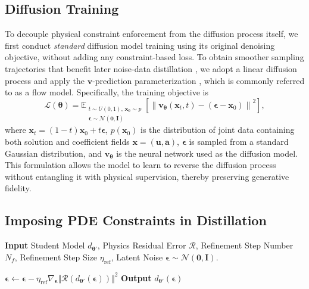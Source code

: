 \documentclass{article}
\theoremstyle{plain}
\theoremstyle{definition}
\theoremstyle{remark}
\def\va{{\bm{a}}}
\def\vu{{\bm{u}}}
\def\vv{{\bm{v}}}
\def\vx{{\bm{x}}}
\begin{document}
\subsection{Diffusion Training}
To decouple physical constraint enforcement from the diffusion process itself, we first conduct \textit{standard} diffusion model training using its original denoising objective, without adding any constraint-based loss. To obtain smoother sampling trajectories that benefit later noise-data distillation \cite{liu2023rectifiedflow, liu2023instaflow}, we adopt a linear diffusion process and apply the $\vv$-prediction parameterization \cite{liu2023rectifiedflow, lipman2023flow, liu2023instaflow, cheng2025eci, esser2024sd3}, which is commonly referred to as a flow model. Specifically, the training objective is
\begin{equation*}
    \mathcal{L}(\bm{\theta})
    = \mathbb{E}_{\substack{t\sim U(0, 1),\, \vx_0\sim p\\
    \bm{\epsilon} \sim \mathcal{N}(\mathbf{0}, \bm{I})}}
    \left[\left\| \vv_{\boldsymbol{\theta}}(\vx_t, t) - (\boldsymbol{\epsilon}-\vx_0) \right\|^2\right],
\end{equation*}
where $\vx_t = (1 - t) \vx_0 + t \boldsymbol{\epsilon}$, $p(\vx_0)$ is the distribution of joint data containing both solution and coefficient fields $\vx=(\vu, \va)$, $\boldsymbol{\epsilon}$ is sampled from a standard Gaussian distribution, and $\vv_{\boldsymbol{\theta}}$ is the neural network used as the diffusion model. This formulation allows the model to learn to reverse the diffusion process without entangling it with physical supervision, thereby preserving generative fidelity.

\subsection{Imposing PDE Constraints in Distillation}
\begin{algorithm}[t]
\caption{PIDDM Inference: Physics Data Simulation}
\label{alg:piddm_inference_generation}
\begin{algorithmic}[1]
\State \textbf{Input} Student Model $d_{\boldsymbol{\theta}'}$, Physics Residual Error $\mathcal{R}$, Refinement Step Number $N_f$, Refinement Step Size $\eta_{\text{ref}}$, Latent Noise $\boldsymbol{\epsilon} \sim \mathcal{N}(\mathbf{0},\mathbf{I})$.

    \State $\boldsymbol{\epsilon} \gets \boldsymbol{\epsilon} - \eta_{\text{ref}}\nabla_{\boldsymbol{\epsilon}}\Vert\mathcal{R}(d_{\boldsymbol{\theta}'}(\boldsymbol{\epsilon}))\Vert^2$
\EndFor
\State \textbf{Output} $d_{\boldsymbol{\theta}'}(\boldsymbol{\epsilon})$
\end{algorithmic}
\end{algorithm}
\end{document}
